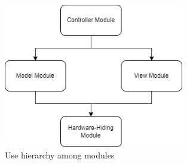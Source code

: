 \documentclass[12pt, titlepage]{article}
\begin{document}
\begin{figure}[H]
\centering
\includegraphics[width=0.7\textwidth]{Poker_UseDiagram.png}
\caption{Use hierarchy among modules}
\label{FigUH}
\end{figure}
\end{document}
